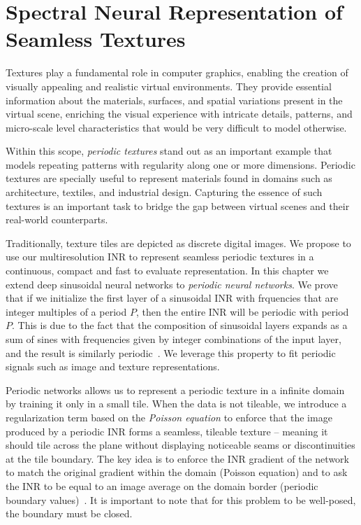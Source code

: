 \chapter{Spectral Neural Representation of Seamless Textures}

Textures play a fundamental role in computer graphics, enabling the creation of visually appealing and realistic virtual environments. They provide essential information about the materials, surfaces, and spatial variations present in the virtual scene, enriching the visual experience with intricate details, patterns, and micro-scale level characteristics that would be very difficult to model otherwise.

Within this scope, \textit{periodic textures} stand out as an important example that models repeating patterns with regularity along one or more dimensions. Periodic textures are specially useful to represent materials found in domains such as architecture, textiles, and industrial design. Capturing the essence of such textures is an important task to bridge the gap between virtual scenes and their real-world counterparts.


Traditionally, texture tiles are depicted as discrete digital images. We propose to use our multiresolution INR to represent seamless periodic textures in a continuous, compact and fast to evaluate representation. In this chapter we extend deep sinusoidal neural networks to \textit{periodic neural networks}. We prove that if we initialize the first layer of a sinusoidal INR with frquencies that are integer multiples of a period $P$, then the entire INR will be periodic with period $P$.  This is due to the fact that the composition of sinusoidal layers expands as a sum of sines with frequencies given by integer combinations of the input layer, and the result is similarly periodic~\cite{novello2022understanding, yuce2022structured}. We leverage this property to fit periodic signals such as image and texture representations.


Periodic networks allows us to represent a periodic texture in a infinite domain by training it only in a small tile. When the data is not tileable, we introduce a regularization term based on the \textit{Poisson equation} to enforce that the image produced by a periodic INR forms a seamless, tileable texture -- meaning it should tile across the plane without displaying noticeable seams or discontinuities at the tile boundary. The key idea is to enforce the INR gradient of the network to match the original gradient within the domain (Poisson equation) and to ask the INR to be equal to an image average on the domain border (periodic boundary values)~\cite{perez2023poisson}. It is important to note that for this problem to be well-posed, the boundary must be closed. 

